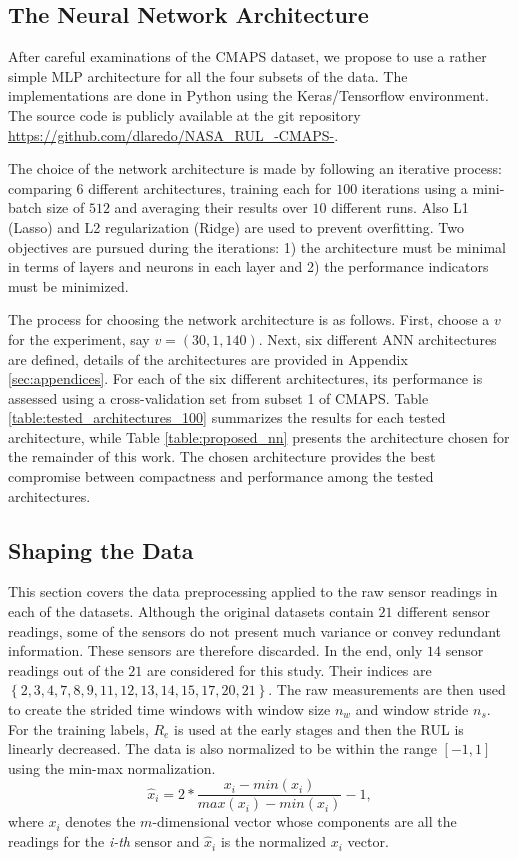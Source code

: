 \documentclass[12pt]{IEEEtran}%
\begin{document}
\subsection{The Neural Network Architecture}

After careful examinations of the CMAPS dataset, we propose to use a rather
simple MLP architecture for all the four subsets of the data. The
implementations are done in Python using the Keras/Tensorflow environment. The
source code is publicly available at the git repository \url{https://github.com/dlaredo/NASA_RUL_-CMAPS-}.

The choice of the network architecture is made by following an iterative
process: comparing 6 different architectures, training each for $100$
iterations using a mini-batch size of $512$ and averaging their results over
$10$ different runs. Also L1 (Lasso) and L2 regularization (Ridge) \cite{Buhlmann2011} are used to prevent overfitting. 
Two objectives are pursued during the iterations: 1) the architecture must be minimal in 
terms of layers and neurons in each layer and 2) the performance indicators must be minimized.

The process for choosing the network architecture is as follows. First, choose
a $v$ for the experiment, say $v= (30, 1, 140)$. Next, six different ANN
architectures are defined, details of the architectures are provided in
Appendix \ref{sec:appendices}. For each of the six different architectures,
its performance is assessed using a cross-validation set from subset 1 of
CMAPS. Table \ref{table:tested_architectures_100} summarizes the results for
each tested architecture, while Table \ref{table:proposed_nn} presents the
architecture chosen for the remainder of this work. The chosen architecture
provides the best compromise between compactness and performance among the
tested architectures.

\subsection{Shaping the Data}

This section covers the data preprocessing applied to the raw sensor readings
in each of the datasets. Although the original datasets contain $21$ different
sensor readings, some of the sensors do not present much variance or convey
redundant information. These sensors are therefore discarded. In the end, only
$14$ sensor readings out of the $21$ are considered for this study. Their
indices are $\left\lbrace 2, 3, 4, 7, 8, 9, 11, 12, 13, 14, 15, 17, 20, 21
\right\rbrace $. The raw measurements are then used to create the strided time
windows with window size $n_{w}$ and window stride $n_{s}$. For the training
labels, $R_{e}$ is used at the early stages and then the RUL is linearly
decreased. The data is also normalized to be within the range $\left[  -1,1
\right]  $ using the min-max normalization.
\begin{equation}
\hat{x}_{i} = 2* \frac{x_{i} - min(x_{i})}{max(x_{i}) - min(x_{i})} - 1,
\label{eq:min_max_norm}%
\end{equation}
where $x_{i}$ denotes the $m$-dimensional vector whose components are all the
readings for the \textit{i-th} sensor and $\hat{x}_{i}$ is the normalized
$x_{i}$ vector.
\end{document}
